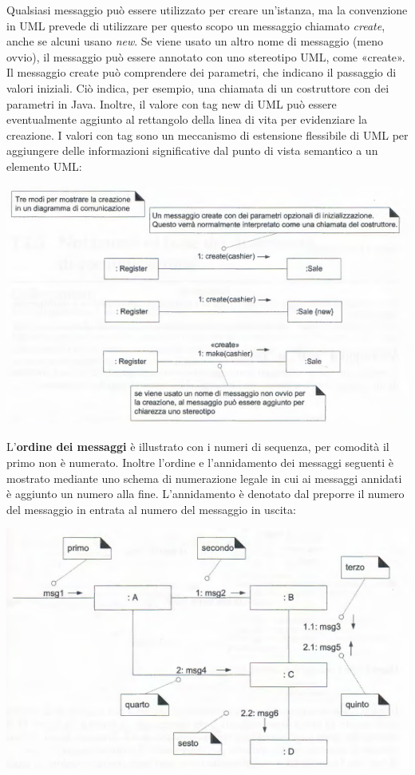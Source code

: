 \documentclass[a4paper,12pt, oneside]{book}
\begin{document}
Qualsiasi messaggio può essere utilizzato per creare un'istanza, ma la convenzione in UML prevede di utilizzare per questo scopo un messaggio chiamato \textit{create}, anche se alcuni usano \textit{new}. Se viene usato un altro nome di messaggio (meno
ovvio), il messaggio può essere annotato con uno stereotipo UML, come «create». Il messaggio create può comprendere dei parametri, che indicano il passaggio di valori iniziali. Ciò indica, per esempio, una chiamata di un costruttore con dei parametri in Java. Inoltre, il valore con tag {new} di UML può essere eventualmente aggiunto al rettangolo della linea di vita per evidenziare la creazione. I valori con tag sono un meccanismo di estensione flessibile di UML per aggiungere delle informazioni significative dal punto di
vista semantico a un elemento UML:
\begin{center}
	\includegraphics[scale=0.7]{img/comd4.png}
\end{center}
L'\textbf{ordine dei messaggi} è illustrato con i numeri di sequenza, per comodità il primo non è numerato. Inoltre l'ordine e l'annidamento dei messaggi seguenti è mostrato mediante uno schema di numerazione legale in cui ai messaggi annidati è aggiunto un numero alla fine. L'annidamento è denotato dal preporre il numero del messaggio in entrata al
numero del messaggio in uscita:
\begin{center}
	\includegraphics[scale=0.7]{img/comd5.png}
\end{center}
\end{document}
